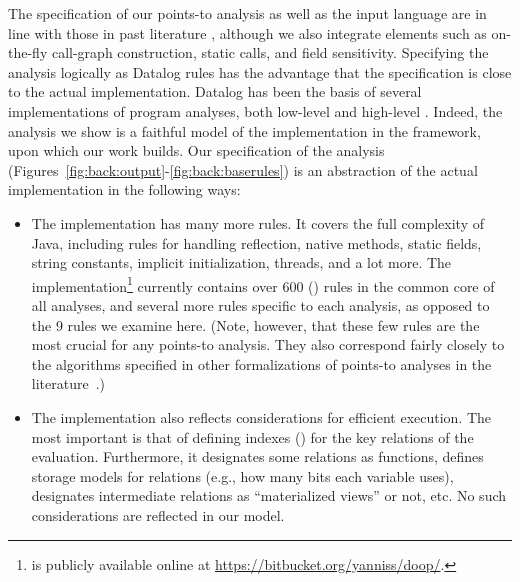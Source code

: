 The specification of our points-to analysis as well as the input language are in line with those in past literature \cite{uss:2009:Guarnieri,fse:2013:Madsen}, although we also integrate elements such as on-the-fly call-graph construction, static calls, and field sensitivity. Specifying the analysis logically as Datalog rules has the advantage that the specification is close to the actual implementation. Datalog has been the basis of several implementations of program analyses, both low-level \cite{col:1994:Reps,aplas:2005:Whaley,pods:2005:Lam,pldi:2004:Whaley,oopsla:2009:Bravenboer} and high-level \cite{icse:2008:Eichberg,ecoop:2006:Hajiyev}. Indeed, the analysis we show is a faithful model of the implementation in the \doop{} framework, upon which our work builds. Our specification of the analysis (Figures~\ref{fig:back:output}-\ref{fig:back:baserules}) is an abstraction of the actual implementation in the following ways:

\begin{itemize}
\item The implementation has many more rules. It covers the full complexity of Java, including rules for handling reflection, native methods, static fields, string constants, implicit initialization, threads, and a lot more. The \doop{} implementation\footnote{\doop{} is publicly available online at \url{https://bitbucket.org/yanniss/doop/}.} currently contains over 600 (\todo{}) rules in the common core of all analyses, and several more rules specific to each analysis, as opposed to the 9 rules we examine here. (Note, however, that these few rules are the most crucial for any points-to analysis. They also correspond fairly closely to the algorithms specified in other formalizations of points-to analyses in the literature~\cite{pldi:2010:Might,popl:2011:Smaragdakis}.)

\item The implementation also reflects considerations for efficient execution. The most important is that of defining indexes (\todo{}) for the key relations of the evaluation. Furthermore, it designates some relations as functions, defines storage models for relations (e.g., how many bits each variable uses), designates intermediate relations as ``materialized views'' or not, etc. No such considerations are reflected in our model.
\end{itemize}

